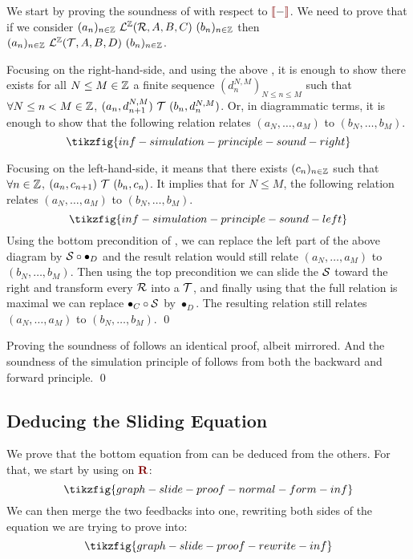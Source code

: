 We start by proving the soundness of  with respect to $\rinterp{-}$. We need to prove that if we consider $(a_n)_{n \in \ZZ}~\L^\ZZ(\R,A,B,C)~(b_n)_{n \in \ZZ}$ then  $(a_n)_{n \in \ZZ}~\L^\ZZ(\T,A,B,D)~(b_n)_{n \in \ZZ}$. 

Focusing on the right-hand-side, and using the above , it is enough to show there exists for all $N \leq M \in \ZZ$ a finite sequence $(d_{n}^{N,M})_{N \leq n \leq M}$ such that $\forall N \leq n < M \in \ZZ$, $(a_n,d^{N,M}_{n+1})~\T~(b_n,d^{N,M}_n)$. Or, in diagrammatic terms, it is enough to show that the following relation relates $(a_N,\dots,a_M)$ to $(b_N,\dots,b_M)$.
\[ \tikzfig{inf-simulation-principle-sound-right} \]

Focusing on the left-hand-side, it means that there exists $(c_n)_{n \in \ZZ}$ such that $\forall n \in \ZZ$, $(a_n,c_{n+1})~\T~(b_n,c_n)$. It implies that for $N \leq M$, the following relation relates $(a_N,\dots,a_M)$ to $(b_N,\dots,b_M)$.
\[ \tikzfig{inf-simulation-principle-sound-left} \]
Using the bottom precondition of , we can replace the left part of the above diagram by $\S \circ \bullet_D$ and the result relation would still relate $(a_N,\dots,a_M)$ to $(b_N,\dots,b_M)$. Then using the top precondition we can slide the $\S$ toward the right and transform every $\R$ into a $\T$, and finally using that the full relation is maximal we can replace $\bullet_C \circ \S$ by $\bullet_D$. The resulting relation still relates $(a_N,\dots,a_M)$ to $(b_N,\dots,b_M)$. \qed

Proving the soundness of  follows an identical proof, albeit mirrored. And the soundness of the simulation principle of  follows from both the backward and forward principle. \qed


\subsection{Deducing the Sliding Equation}\label{app:inf-slide}

We prove that the bottom equation from  can be deduced from the others. For that, we start by using  on $\rR$:
\[\tikzfig{graph-slide-proof-normal-form-inf}\]
We can then merge the two feedbacks into one, rewriting both sides of the equation we are trying to prove into:
\[\tikzfig{graph-slide-proof-rewrite-inf}\]

